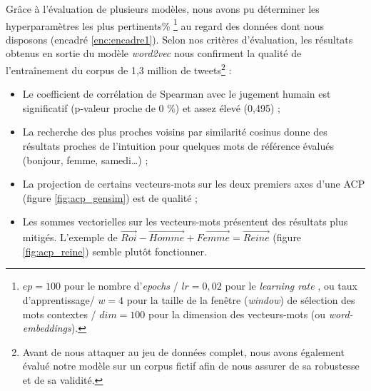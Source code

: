 \documentclass[10pt,french,french]{article}
\let\rmarkdownfootnote\footnote%
\def\footnote{\protect\rmarkdownfootnote}
\begin{document}
Grâce à l'évaluation de plusieurs modèles, nous avons pu déterminer les hyperparamètres les plus pertinents\%
\footnote{
$ep = 100$ pour le nombre d'\og \emph{epochs} \fg / $lr = 0,02$ pour le \og \emph{learning rate} \fg, ou taux d'apprentissage/ $w = 4$ pour la taille de la fenêtre (\emph{window}) de sélection des mots contextes / $dim = 100$ pour la dimension des vecteurs-mots (ou \emph{word-embeddings}).
} au regard des données dont nous disposons (encadré \ref{enc:encadre1}).
Selon nos critères d'évaluation, les résultats obtenus en sortie du modèle \emph{word2vec} nous confirment la qualité de l'entraînement du corpus de 1,3 million de tweets\footnote{Avant de nous attaquer au jeu de données complet, nous avons également évalué notre modèle sur un corpus fictif afin de nous assurer de sa robustesse et de sa validité.} :

\begin{itemize}
\item Le coefficient de corrélation de Spearman avec le jugement humain est significatif (p-valeur proche de 0 \%) et assez élevé (0,495) ;
\item La recherche des plus proches voisins par similarité cosinus donne des résultats proches de l'intuition pour quelques mots de référence évalués (bonjour, femme, samedi\dots) ;
\item La projection de certains vecteurs-mots sur les deux premiers axes d'une ACP (figure \ref{fig:acp_gensim}) est de qualité ;
\item Les sommes vectorielles sur les vecteurs-mots présentent des résultats plus mitigés. L'exemple de  $\overrightarrow{Roi} - \overrightarrow{Homme} + \overrightarrow{Femme} = \overrightarrow{Reine}$ (figure \ref{fig:acp_reine}) semble plutôt fonctionner. 
\end{itemize}
\end{document}
